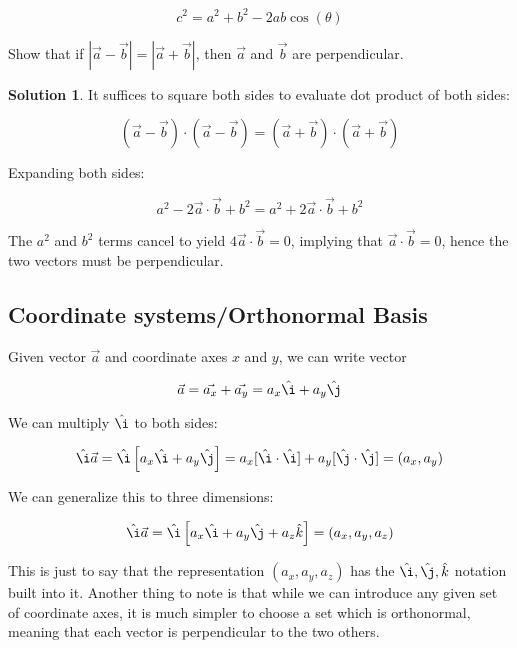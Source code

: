 \documentclass{article}
\theoremstyle{definition}
\newtheorem*{solution}{\color{blue}Solution}
\numberwithin{equation}{section}
\numberwithin{definition}{section}
\begin{document}
\begin{equation}
	c^2 = a^2 + b^2 - 2ab\cos(\theta)
\end{equation}

\begin{example}
	
	Show that if $|\vec{a} - \vec{b}| = |\vec{a} + \vec{b}|$, then $\vec{a}$ and $\vec{b}$ are perpendicular.

\end{example}

\begin{solution}
	It suffices to square both sides to evaluate dot product of both sides: 
	
	\[ (\vec{a} - \vec{b}) \cdot (\vec{a} - \vec{b}) = (\vec{a} + \vec{b})\cdot (\vec{a} + \vec{b})\]
	
	Expanding both sides: 
	
	\[ a^2 - 2 \vec{a} \cdot \vec{b} + b^2 = a^2 + 2\vec{a} \cdot \vec{b} + b^2\]
	
	The $a^2$ and $b^2$ terms cancel to yield $4\vec{a} \cdot \vec{b} = 0$, implying that $\vec{a} \cdot \vec{b} = 0$, hence the two vectors must be perpendicular.
\end{solution}
	
	\subsection{Coordinate systems/Orthonormal Basis}
	
	Given vector $\vec{a}$ and coordinate axes $x$ and $y$, we can write vector 
	
	\[\vec{a} = \vec{a_x} + \vec{a_y} = a_x \hat{\i} + a_y\hat{\j}\]
	
	We can multiply $\hat{\i}$ to both sides:
	
	\[ \hat{\i} \vec{a} = \hat{\i}\left[a_x \hat{\i} + a_y \hat{\j}\right] = a_x[\hat{\i} \cdot \hat{\i} ] + a_y[\hat{\j} \cdot \hat{\j}] = (a_x, a_y)\]
		
	We can generalize this to three dimensions:
	
	\[ \hat{\i} \vec{a} = \hat{\i} \left[a_x \hat{\i} + a_y \hat{\j} + a_z \hat{k}\right] = (a_x, a_y, a_z)\] 
		
	
	This is just to say that the representation $(a_x, a_y, a_z)$ has the $\hat{\i}, \hat{\j}, \hat{k}$ notation built into it. Another thing to note is that while we can introduce any given set of coordinate axes, it is much simpler to choose a  set which is orthonormal, meaning that each vector is perpendicular to the two others.  
		
		
	
	
\end{document}
